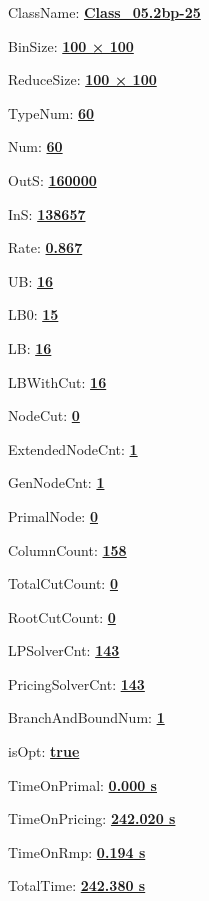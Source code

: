 \documentclass[11pt]{article}
\begin{document}
\pagestyle{empty}


ClassName: \underline{\textbf{Class_05.2bp-25}}
\par
BinSize: \underline{\textbf{100 × 100}}
\par
ReduceSize: \underline{\textbf{100 × 100}}
\par
TypeNum: \underline{\textbf{60}}
\par
Num: \underline{\textbf{60}}
\par
OutS: \underline{\textbf{160000}}
\par
InS: \underline{\textbf{138657}}
\par
Rate: \underline{\textbf{0.867}}
\par
UB: \underline{\textbf{16}}
\par
LB0: \underline{\textbf{15}}
\par
LB: \underline{\textbf{16}}
\par
LBWithCut: \underline{\textbf{16}}
\par
NodeCut: \underline{\textbf{0}}
\par
ExtendedNodeCnt: \underline{\textbf{1}}
\par
GenNodeCnt: \underline{\textbf{1}}
\par
PrimalNode: \underline{\textbf{0}}
\par
ColumnCount: \underline{\textbf{158}}
\par
TotalCutCount: \underline{\textbf{0}}
\par
RootCutCount: \underline{\textbf{0}}
\par
LPSolverCnt: \underline{\textbf{143}}
\par
PricingSolverCnt: \underline{\textbf{143}}
\par
BranchAndBoundNum: \underline{\textbf{1}}
\par
isOpt: \underline{\textbf{true}}
\par
TimeOnPrimal: \underline{\textbf{0.000 s}}
\par
TimeOnPricing: \underline{\textbf{242.020 s}}
\par
TimeOnRmp: \underline{\textbf{0.194 s}}
\par
TotalTime: \underline{\textbf{242.380 s}}
\par
\newpage


\end{document}
